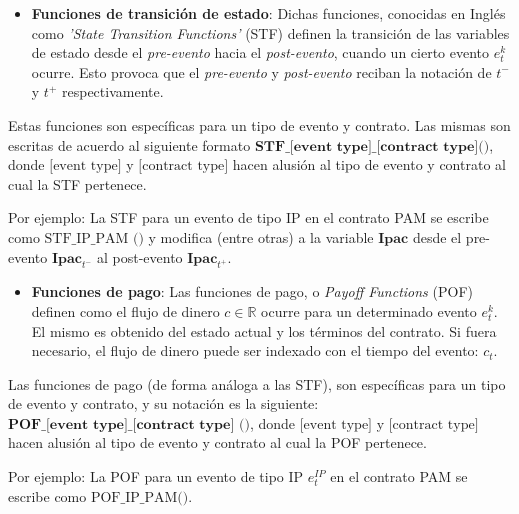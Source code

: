 \documentclass{beamer}
\begin{document}
\begin{frame}
    \begin{itemize}
        \item \textbf{Funciones de transición de estado}: Dichas funciones, conocidas en Inglés como \textit{'State Transition Functions'} (STF) definen la transición de las variables de estado desde el \textit{pre-evento} hacia el \textit{post-evento}, cuando un cierto evento $e^k_t$ ocurre. Esto provoca que el  \textit{pre-evento} y \textit{post-evento} reciban la notación de $t^-$ y $t^+$ respectivamente.

  \end{itemize}
  \pause
  \vfill
  Estas funciones son específicas para un tipo de evento y contrato. Las mismas son escritas de acuerdo al siguiente formato $\textbf{STF\_[event type]\_[contract type]()}$, donde $\text{[event type]}$ y $\text{[contract type]}$ hacen alusión al tipo de evento y contrato al cual la STF pertenece.
  \medskip
  \pause

  Por ejemplo: La STF para un evento de tipo IP en el contrato PAM se escribe como $\text{STF\_IP\_PAM ()}$ y modifica (entre otras) a la variable $\textbf{Ipac}$ desde el pre-evento $\textbf{Ipac}_{t^-}$ al post-evento $\textbf{Ipac}_{t^+}$.

\end{frame}

\begin{frame}
    \begin{itemize}
        \item \textbf{Funciones de pago}: Las funciones de pago, o \textit{Payoff Functions} (POF) definen como el flujo de dinero $c \in\mathbb{R}$ ocurre para un determinado evento $e^k_t$. El mismo es obtenido del estado actual y los términos del contrato. Si fuera necesario, el flujo de dinero puede ser indexado con el tiempo del evento: $c_t$.
    \end{itemize}
    \pause
    \vfill
    Las funciones de pago (de forma análoga a las STF), son específicas para un tipo de evento y contrato, y su notación es la siguiente: $\textbf{POF\_[event type]\_[contract type] ()}$, donde $\text{[event type]}$ y $\text{[contract type]}$ hacen alusión al tipo de evento y contrato al cual la POF pertenece.
    \medskip
    \pause

    Por ejemplo: La POF para un evento de tipo IP $e^{IP}_t$ en el contrato PAM se escribe como $\text{POF\_IP\_PAM()}$.

\end{frame}
\end{document}
